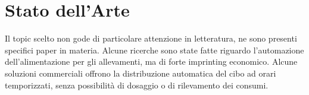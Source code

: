 

\chapter{Stato dell'Arte}
Il topic scelto non gode di particolare attenzione in letteratura, ne sono presenti specifici paper in materia. Alcune ricerche sono state fatte riguardo l'automazione dell’alimentazione per gli allevamenti, ma di forte imprinting economico. 
Alcune soluzioni commerciali offrono la distribuzione automatica del cibo ad orari temporizzati, senza possibilità di dosaggio o di rilevamento dei consumi. 
